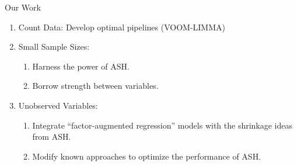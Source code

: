 \documentclass[evncountsect]{beamer}
\begin{document}
\begin{frame}{Our Work}
  \begin{enumerate}
  \item Count Data: Develop optimal pipelines (VOOM-LIMMA)
  \item Small Sample Sizes:
    \begin{enumerate}
    \item Harness the power of ASH.
    \item Borrow strength between variables.
    \end{enumerate}
  \item Unobserved Variables:
    \begin{enumerate}
    \item Integrate ``factor-augmented regression'' models with the shrinkage ideas from ASH.
    \item Modify known approaches to optimize the performance of ASH.
    \end{enumerate}
  \end{enumerate}
\end{frame}
\end{document}

